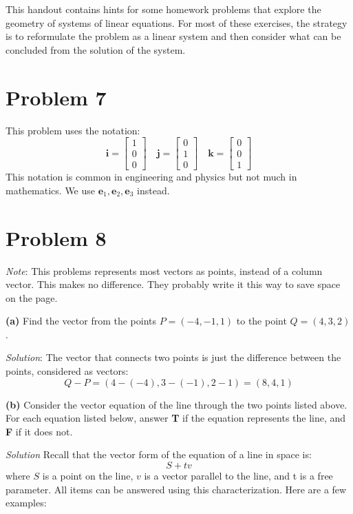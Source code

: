 \documentclass[12pt]{article}
\begin{document}
This handout contains hints for some homework problems that explore the geometry of systems of linear equations. For most of these exercises, the strategy is to reformulate the problem as a linear system and then consider what can be concluded from the solution of the system.

\section{Problem 7} This problem uses the notation:
\[
\mathbf{i}=\begin{bmatrix} 1\\ 0\\ 0\end{bmatrix}\quad
\mathbf{j}=\begin{bmatrix} 0\\ 1\\ 0\end{bmatrix}\quad
\mathbf{k}=\begin{bmatrix} 0\\ 0\\ 1\end{bmatrix}
\]
This notation is common in engineering and physics but not much in mathematics. We use $\mathbf{e}_1,\mathbf{e}_2,\mathbf{e}_3$ instead.

\section{Problem 8}

\emph{Note}: This problems represents most vectors as points, instead of a column vector. This makes no difference. They probably write it this way to save space on the page.

\textbf{(a)} Find the vector from the points $P=(-4,-1,1)$ to the point $Q=(4,3,2)$.

\emph{Solution}: The vector that connects two points is just the difference between the points, considered as vectors:
\[
Q-P=(4-(-4),3-(-1),2-1)=(8,4,1)
\]

\textbf{(b)} Consider the vector equation of the line through the two points listed above. For each equation listed below, answer \textbf{T} if the equation represents the line, and \textbf{F} if it does not.

\emph{Solution} Recall that the vector form of the equation of a line in space is:
\[
S+t v
\]
where $S$ is a point on the line, $v$ is a vector parallel to the line, and t is a free parameter. All items can be answered using this characterization. Here are a few examples:
\end{document}
